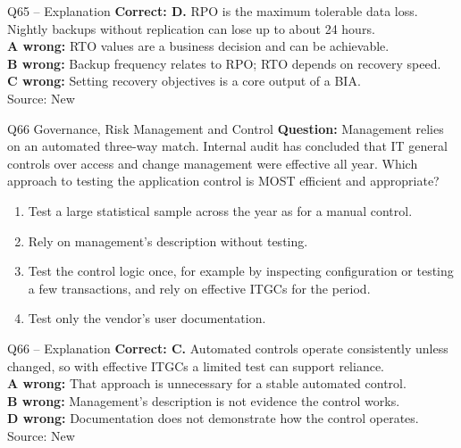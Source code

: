 \documentclass[aspectratio=169,10pt]{beamer}
\begin{document}
\begin{frame}[t]{Q65 -- Explanation}
	\footnotesize
	\textbf{Correct: D.} RPO is the maximum tolerable data loss. Nightly backups without replication can lose up to about 24 hours. \\[5pt]
\textbf{A wrong:} RTO values are a business decision and can be achievable. \\[3pt]
\textbf{B wrong:} Backup frequency relates to RPO; RTO depends on recovery speed. \\[3pt]
\textbf{C wrong:} Setting recovery objectives is a core output of a BIA. \\[3pt]
	\vfill {\tiny Source: New}
\end{frame}

\begin{frame}[t]{Q66 \hfill {\scriptsize Governance, Risk Management and Control}}
	\small
	\textbf{Question:} Management relies on an automated three-way match. Internal audit has concluded that IT general controls over access and change management were effective all year. Which approach to testing the application control is MOST efficient and appropriate?
	\begin{enumerate}[label=\Alph*.,itemsep=1pt,topsep=3pt]
			\item Test a large statistical sample across the year as for a manual control.
			\item Rely on management's description without testing.
			\item Test the control logic once, for example by inspecting configuration or testing a few transactions, and rely on effective ITGCs for the period.
			\item Test only the vendor's user documentation.
	\end{enumerate}
\end{frame}

\begin{frame}[t]{Q66 -- Explanation}
	\footnotesize
	\textbf{Correct: C.} Automated controls operate consistently unless changed, so with effective ITGCs a limited test can support reliance. \\[5pt]
\textbf{A wrong:} That approach is unnecessary for a stable automated control. \\[3pt]
\textbf{B wrong:} Management's description is not evidence the control works. \\[3pt]
\textbf{D wrong:} Documentation does not demonstrate how the control operates. \\[3pt]
	\vfill {\tiny Source: New}
\end{frame}
\end{document}

